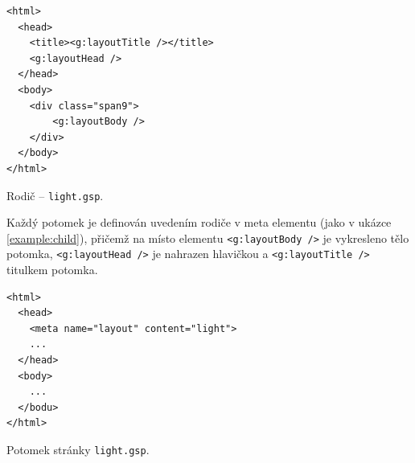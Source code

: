 \begin{example}
    \centering
    \begin{lstlisting}
<html>
  <head>
    <title><g:layoutTitle /></title>
    <g:layoutHead />
  </head>
  <body>
    <div class="span9">
        <g:layoutBody />
    </div>
  </body>
</html>
    \end{lstlisting}
    \caption{Rodič -- \texttt{light.gsp}.}
    \label{example:parent}
\end{example}

Každý potomek je definován uvedením rodiče v meta elementu (jako v ukázce \ref{example:child}), přičemž na místo elementu \texttt{<g:layoutBody />} je vykresleno tělo potomka, \texttt{<g:layoutHead />} je nahrazen hlavičkou a \texttt{<g:layoutTitle />} titulkem potomka.
\begin{example}
    \centering
    \begin{lstlisting}
<html>
  <head>
    <meta name="layout" content="light">
    ...
  </head>
  <body>
    ...
  </bodu>
</html>
    \end{lstlisting}
    \caption{Potomek stránky \texttt{light.gsp}.}
    \label{example:child}
\end{example}
